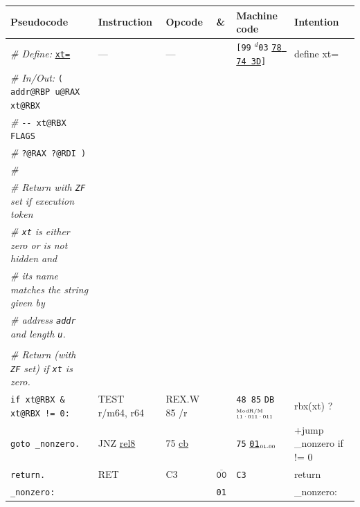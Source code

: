 \documentclass[a4paper,12pt,final]{article}
\begin{document}
\begin{table}[!htbp] \begin{adjustwidth}{-1cm}{-1cm} \fontsize{10}{12.000000}\selectfont
\begin{center}
\begin{tabular}{l|ll|l|lH}
\textbf{Pseudocode} & \textbf{Instruction} & \textbf{Opcode} & \textbf{\&} & \textbf{Machine code} & \textbf{Intention}\\[0pt]
\hline
\emph{\# Define:} \uline{\texttt{xt=}} & --- & --- &  & \texttt{[99} \(^{d}\)​\texttt{03} \uline{\texttt{78 74 3D}}​\texttt{]} & define xt=\\[0pt]
\emph{\# In/Out:}    \texttt{( addr@RBP u@RAX xt@RBX} &  &  &  &  & \\[0pt]
\emph{\#}\hspace{3.35em} \texttt{-​- xt@RBX FLAGS} &  &  &  &  & \\[0pt]
\emph{\#}\hspace{4.9em}      \texttt{?@RAX ?@RDI )} &  &  &  &  & \\[0pt]
\emph{\#} &  &  &  &  & \\[0pt]
\emph{\# Return with \texttt{ZF} set if execution token} &  &  &  &  & \\[0pt]
\emph{\# \texttt{xt} is either zero or is not hidden and} &  &  &  &  & \\[0pt]
\emph{\# its name matches the string given by} &  &  &  &  & \\[0pt]
\emph{\# address \texttt{addr} and length \texttt{u}.} &  &  &  &  & \\[0pt]
 &  &  &  &  & \\[0pt]
\hspace{1.053000em} \emph{\# Return (with \texttt{ZF} set) if \texttt{xt} is zero.} &  &  &  &  & \\[0pt]
\hspace{1.053000em} \texttt{if xt@RBX \& xt@RBX != 0:} & TEST r/m64, r64 & REX.W 85 /r &  & \texttt{48 85} \texttt{DB}​\(^{\text{\tiny ModR/M}}_{\text{\tiny 11·011·011}}\) & rbx(xt) ?\\[0pt]
\hspace{2.106000em}   \texttt{goto \_nonzero.} & JNZ \uline{rel8} & 75 \uline{cb} &  & \texttt{75} \uline{\texttt{01}}​\(_{\text{\tiny 01-00}}\) & +jump \_nonzero if != 0\\[0pt]
\hspace{1.053000em} \texttt{return.} & RET & C3 & \(\overline{\texttt{00}}\) & \texttt{C3} & return\\[0pt]
\texttt{\_nonzero:} &  &  & \texttt{01} &  & \_nonzero:\\[0pt]

\end{tabular}
\end{center}
\end{adjustwidth}
\end{table}
\end{document}
